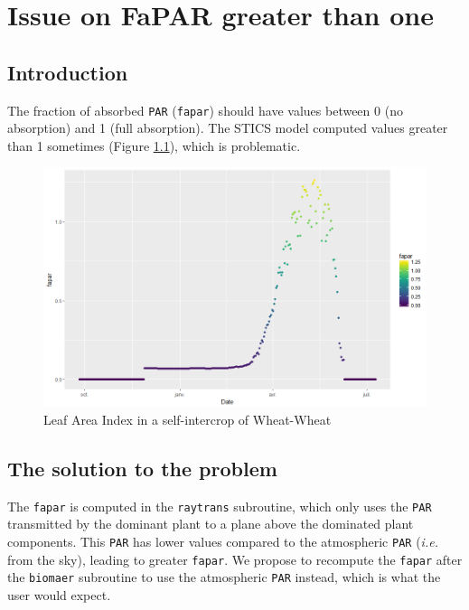 \documentclass[
]{book}
\begin{document}
\hypertarget{FAPARissue}{%
\chapter{Issue on FaPAR greater than one}\label{FAPARissue}}

\hypertarget{introduction-6}{%
\section{Introduction}\label{introduction-6}}

The fraction of absorbed \texttt{PAR} (\texttt{fapar}) should have values between 0 (no absorption) and 1 (full absorption). The STICS model computed values greater than 1 sometimes (Figure \ref{fig:FAPARhigh}), which is problematic.

\begin{figure}
\centering
\includegraphics{img/FAPARhigh.png}
\caption{\label{fig:FAPARhigh}Leaf Area Index in a self-intercrop of Wheat-Wheat}
\end{figure}

\hypertarget{the-solution-to-the-problem}{%
\section{The solution to the problem}\label{the-solution-to-the-problem}}

The \texttt{fapar} is computed in the \texttt{raytrans} subroutine, which only uses the \texttt{PAR} transmitted by the dominant plant to a plane above the dominated plant components. This \texttt{PAR} has lower values compared to the atmospheric \texttt{PAR} (\emph{i.e.} from the sky), leading to greater \texttt{fapar}.
We propose to recompute the \texttt{fapar} after the \texttt{biomaer} subroutine to use the atmospheric \texttt{PAR} instead, which is what the user would expect.
\end{document}
